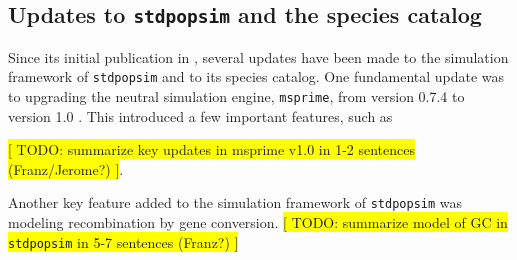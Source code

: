 \documentclass[hidelinks]{article}
\newcommand{\stdpopsim}{\texttt{stdpopsim}\xspace}
\begin{document}
%
%
%





\hypertarget{sec3}{%
	\subsection*{Updates to \stdpopsim and the species catalog}\label{sec:expanded-catalog}}

Since its initial publication in \cite{Adrion2020}, several updates have been made
to  the simulation framework of \stdpopsim and to its species catalog.
One fundamental update was to upgrading the neutral simulation engine,
\texttt{msprime}, from version 0.7.4 to version 1.0 \citep{Baumdicker2022}.
This introduced a few important features, such as %

\colorbox{yellow}{[ TODO: summarize key updates in msprime v1.0 in 1-2 sentences (Franz/Jerome?) ]}.


Another key feature added to the simulation framework of \stdpopsim
was modeling recombination by gene conversion. %
\colorbox{yellow}{[ TODO: summarize model of GC in \stdpopsim in 5-7 sentences (Franz?) ]}
\end{document}
